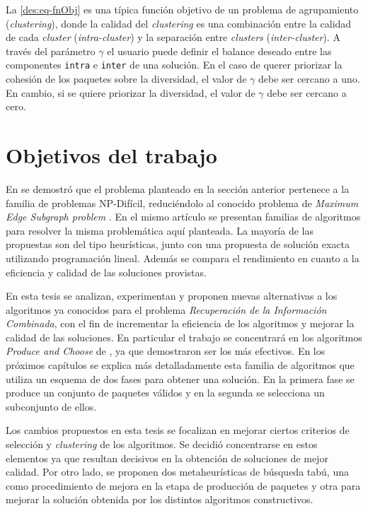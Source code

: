 La \autoref{des:eq-fnObj} es una típica función objetivo de un problema de agrupamiento ({\em clustering}), donde la calidad del {\em clustering} es una combinación entre la calidad de cada {\em cluster} ({\em intra-cluster}) y la separación entre {\em clusters} ({\em inter-cluster}). A través del parámetro $\gamma$ el usuario puede definir el balance deseado entre las componentes \texttt{intra} e \texttt{inter} de una solución. En el caso de querer priorizar la cohesión de los paquetes sobre la diversidad, el  valor de $\gamma$ debe ser cercano a uno. En cambio, si se quiere priorizar la diversidad, el valor de $\gamma$ debe ser cercano a cero.

\section{Objetivos del trabajo}
En \cite{journals/tkde/Amer-YahiaBCFMZ14} se demostró que el problema planteado en la sección anterior pertenece a la familia de problemas NP-Difícil, reduciéndolo al conocido problema de {\em Maximum Edge Subgraph problem} \cite{finding_maximum_density_subgraph}. En el mismo artículo se presentan familias de algoritmos para resolver la misma problemática aquí planteada. La mayoría de las propuestas son del tipo heurísticas, junto con una propuesta de solución exacta utilizando programación lineal. Además se compara el rendimiento en cuanto a la eficiencia y calidad de las soluciones provistas.

En esta tesis se analizan, experimentan y proponen nuevas alternativas a los algoritmos ya conocidos para el problema {\em Recuperación de la Información Combinada}, con el fin de incrementar la eficiencia de los algoritmos y mejorar la calidad de las soluciones. En particular el trabajo se concentrará en los algoritmos {\em Produce and Choose} de \cite{journals/tkde/Amer-YahiaBCFMZ14}, ya que demostraron ser los más efectivos. En los próximos capítulos se explica más detalladamente esta familia de algoritmos que utiliza un esquema de dos fases para obtener una solución. En la primera fase se produce un conjunto de paquetes válidos y en la segunda se selecciona un subconjunto de ellos.

Los cambios propuestos en esta tesis se focalizan en mejorar ciertos criterios de selección y {\em clustering} de los algoritmos. Se decidió concentrarse en estos elementos ya que  resultan decisivos en la obtención de soluciones de mejor calidad. Por otro lado, se proponen dos metaheurísticas de búsqueda tabú, una como procedimiento de mejora en la etapa de producción de paquetes y otra para mejorar la solución obtenida por los distintos algoritmos constructivos.

